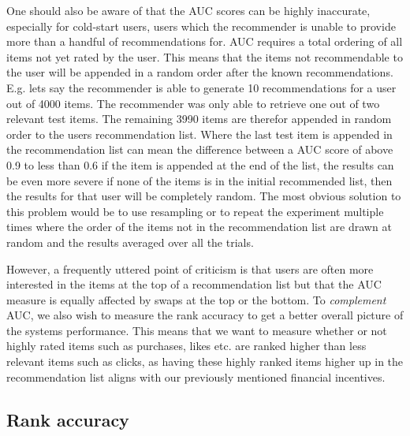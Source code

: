 One should also be aware of that the AUC scores can be highly inaccurate, especially for cold-start users,
users which the recommender is unable to provide more than a handful of recommendations for. AUC requires
a total ordering of all items not yet rated by the user. This means that the items not recommendable
to the user will be appended in a random order after the known recommendations.
E.g. lets say the recommender is able to generate 10 recommendations for a user out of 4000 items.
The recommender was only able to retrieve one out of two relevant test items. The remaining 3990
items are therefor appended in random order to the users recommendation list.
Where the last test item is appended in the recommendation list can mean the difference between a AUC score of above
0.9 to less than 0.6 if the item is appended at the end of the list, the results can be even more
severe if none of the items is in the initial recommended list, then the results for that user will be
completely random. The most obvious solution to this problem would be to use resampling or to repeat
the experiment multiple times where the order of the items not in the recommendation list are drawn at random and
the results averaged over all the trials.

However, a frequently uttered point of criticism is that users are often more interested in the items
at the top of a recommendation list but that the AUC measure is equally affected by swaps at the top
or the bottom. To \emph{complement} AUC, we also wish to measure the rank accuracy to get a better
overall picture of the systems performance. This means that we want to measure whether or not
highly rated items such as purchases, likes etc. are ranked higher than less relevant items such as clicks,
as having these highly ranked items higher up in the recommendation list aligns with our previously
mentioned financial incentives.


\subsection{Rank accuracy}


